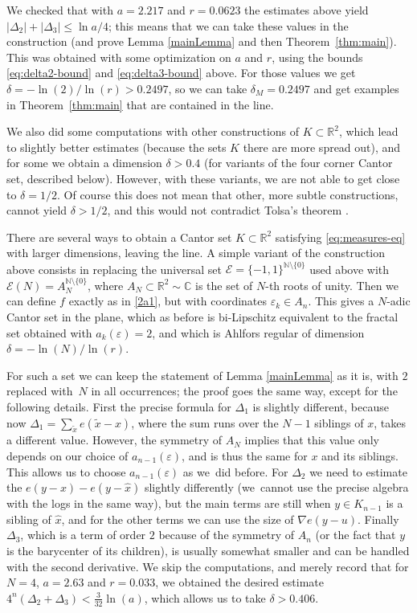 \documentclass[10pt]{amsart}
\let\sm\setminus
\let\wt\widetilde
\let\wh\widehat
\numberwithin{equation}{section}
\theoremstyle{plain}
\theoremstyle{definition}
\newcommand{\R}{\mathbb{R}}
\newcommand{\bN}{\mathbb{N}}
\newcommand{\bC}{\mathbb{C}}
\newcommand{\cE}{{\mathcal E}}
\begin{document}
We checked that with $a= 2.217$ and $r= 0.0623$
the estimates above yield $|\Delta_2|+ |\Delta_3| \le \ln a/4$; this means that we can take
these values in the construction (and prove Lemma \ref{mainLemma} and then Theorem~\ref{thm:main}).
This was obtained with some optimization on $a$ and $r$, using the bounds \eqref{eq:delta2-bound}
and \eqref{eq:delta3-bound} above.
For those values we get $\delta = -\ln(2)/\ln(r)> 0.2497$, so we can take $\delta_M = 0.2497$
and get examples in Theorem~\ref{thm:main} that are contained in the line.

We also did some computations with other constructions of $K \subset \R^2$,
which lead to slightly better estimates (because the sets $K$ there are more spread out),
and for some we obtain a dimension $\delta > 0.4$ (for variants of the four corner Cantor set, described below).
However, with these variants, we are not able to get close to $\delta = 1/2$.
Of course this does not mean that other, more subtle constructions, cannot yield $\delta > 1/2$, and this would
not contradict Tolsa's theorem \cite{Tolsa2023ADreg}.

There are several ways to obtain a Cantor set $K \subset \R^2$ satisfying \eqref{eq:measures-eq}
with larger dimensions, leaving the line. A simple variant of the construction above consists in replacing
the universal set $\cE = \{ -1, 1 \}^{\bN \sm \{ 0 \}}$ used above with
$\cE(N) = A_N^{\bN \sm \{ 0 \}}$, where $A_N \subset \R^2 \sim \bC$ is the set of $N$-th roots of
unity. Then we can define $f$ exactly as in \eqref{2a1}, but with coordinates $\varepsilon_k \in A_n$.
This gives a $N$-adic Cantor set in the plane, which as before is bi-Lipschitz equivalent to the fractal set
obtained with $a_{k}(\varepsilon) = 2$, and which is Ahlfors regular of dimension $\delta = - \ln(N)/\ln(r)$.

For such a set we can keep the statement of Lemma \ref{mainLemma} as it is, with $2$ replaced
with~$N$ in all occurrences; the proof goes the same way, except for the following details.
First the precise formula for $\Delta_1$ is slightly different, because now
$\Delta_1 = \sum_{\wt x} e(\wt x-x)$, where the sum runs over the $N-1$ siblings of
$x$, takes a different value. However, the symmetry of $A_N$ implies that this value only depends on our choice of $a_{n-1}(\varepsilon)$, and is thus the same
for $x$ and its siblings. This allows us to choose $a_{n-1}(\varepsilon)$ as we~did before.
For $\Delta_2$ we need to estimate the $e(y-x) - e(y-\wh x)$ slightly differently (we~cannot use
the precise algebra with the logs in the same way), but the main terms are still when $y \in K_{n-1}$
is a sibling of $\wh x$, and for the other terms we can use the size of $\nabla e(y-u)$. Finally
$\Delta_3$, which is a term of order $2$ because of the symmetry of $A_n$ (or the fact that
$y$ is the barycenter of its children), is usually somewhat smaller and can be handled with the second derivative.
We skip the computations, and merely record that for $N=4$, $a=2.63$ and $r = 0.033$, we obtained
the desired estimate $4^n(\Delta_2+\Delta_3) < \frac{3}{32} \ln(a)$, which allows us to take $\delta > 0.406$.
\end{document}
